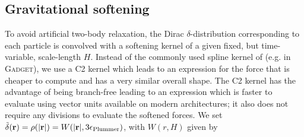\subsection{Gravitational softening}
\label{ssec:potential_softening}

To avoid artificial two-body relaxation, the Dirac
$\delta$-distribution corresponding to each particle is convolved with
a softening kernel of a given fixed, but time-variable, scale-length
$H$. Instead of the commonly used spline kernel of
\cite{Monaghan1985} (e.g. in \textsc{Gadget}), we use a C2 kernel
\citep{Wendland1995} which leads to an expression for the force that
is cheaper to compute and has a very similar overall shape. The C2
kernel has the advantage of being branch-free leading to an expression
which is faster to evaluate using vector units available on modern
architectures; it also does not require any divisions to evaluate the
softened forces. We set $\tilde\delta(\mathbf{r}) = \rho(|\mathbf{r}|)
= W(|\mathbf{r}|, 3\epsilon_{\rm Plummer})$, with $W(r, H)$ given by

